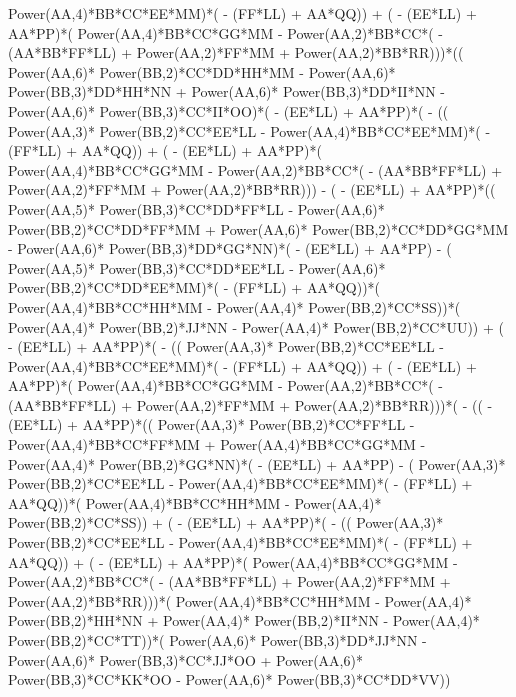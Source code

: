 \documentclass[10pt]{article} %
\begin{document}
{Power(AA,4)*BB*CC*EE*MM)*( - (FF*LL) + AA*QQ)) + ( - (EE*LL) + AA*PP)*( Power(AA,4)*BB*CC*GG*MM -  Power(AA,2)*BB*CC*( - (AA*BB*FF*LL) +  Power(AA,2)*FF*MM +  Power(AA,2)*BB*RR)))*(( Power(AA,6)* Power(BB,2)*CC*DD*HH*MM -  Power(AA,6)* Power(BB,3)*DD*HH*NN +  Power(AA,6)* Power(BB,3)*DD*II*NN -  Power(AA,6)* Power(BB,3)*CC*II*OO)*( - (EE*LL) + AA*PP)*( - (( Power(AA,3)* Power(BB,2)*CC*EE*LL -  Power(AA,4)*BB*CC*EE*MM)*( - (FF*LL) + AA*QQ)) + ( - (EE*LL) + AA*PP)*( Power(AA,4)*BB*CC*GG*MM -  Power(AA,2)*BB*CC*( - (AA*BB*FF*LL) +  Power(AA,2)*FF*MM +  Power(AA,2)*BB*RR))) - ( - (EE*LL) + AA*PP)*(( Power(AA,5)* Power(BB,3)*CC*DD*FF*LL -  Power(AA,6)* Power(BB,2)*CC*DD*FF*MM +  Power(AA,6)* Power(BB,2)*CC*DD*GG*MM -  Power(AA,6)* Power(BB,3)*DD*GG*NN)*( - (EE*LL) + AA*PP) - ( Power(AA,5)* Power(BB,3)*CC*DD*EE*LL -  Power(AA,6)* Power(BB,2)*CC*DD*EE*MM)*( - (FF*LL) + AA*QQ))*( Power(AA,4)*BB*CC*HH*MM -  Power(AA,4)* Power(BB,2)*CC*SS))*( Power(AA,4)* Power(BB,2)*JJ*NN -  Power(AA,4)* Power(BB,2)*CC*UU)) + ( - (EE*LL) + AA*PP)*( - (( Power(AA,3)* Power(BB,2)*CC*EE*LL -  Power(AA,4)*BB*CC*EE*MM)*( - (FF*LL) + AA*QQ)) + ( - (EE*LL) + AA*PP)*( Power(AA,4)*BB*CC*GG*MM -  Power(AA,2)*BB*CC*( - (AA*BB*FF*LL) +  Power(AA,2)*FF*MM +  Power(AA,2)*BB*RR)))*( - (( - (EE*LL) + AA*PP)*(( Power(AA,3)* Power(BB,2)*CC*FF*LL -  Power(AA,4)*BB*CC*FF*MM +  Power(AA,4)*BB*CC*GG*MM -  Power(AA,4)* Power(BB,2)*GG*NN)*( - (EE*LL) + AA*PP) - ( Power(AA,3)* Power(BB,2)*CC*EE*LL -  Power(AA,4)*BB*CC*EE*MM)*( - (FF*LL) + AA*QQ))*( Power(AA,4)*BB*CC*HH*MM -  Power(AA,4)* Power(BB,2)*CC*SS)) + ( - (EE*LL) + AA*PP)*( - (( Power(AA,3)* Power(BB,2)*CC*EE*LL -  Power(AA,4)*BB*CC*EE*MM)*( - (FF*LL) + AA*QQ)) + ( - (EE*LL) + AA*PP)*( Power(AA,4)*BB*CC*GG*MM -  Power(AA,2)*BB*CC*( - (AA*BB*FF*LL) +  Power(AA,2)*FF*MM +  Power(AA,2)*BB*RR)))*( Power(AA,4)*BB*CC*HH*MM -  Power(AA,4)* Power(BB,2)*HH*NN +  Power(AA,4)* Power(BB,2)*II*NN -  Power(AA,4)* Power(BB,2)*CC*TT))*( Power(AA,6)* Power(BB,3)*DD*JJ*NN -  Power(AA,6)* Power(BB,3)*CC*JJ*OO +  Power(AA,6)* Power(BB,3)*CC*KK*OO -  Power(AA,6)* Power(BB,3)*CC*DD*VV))
}\break
\end{document}
